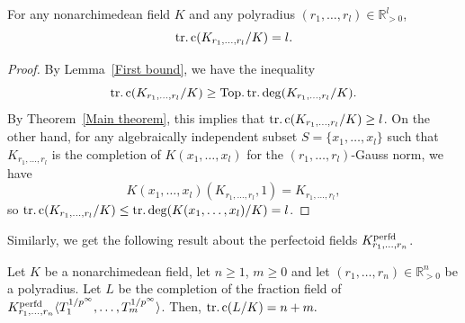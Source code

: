 \begin{cor}
    \label{cor:kr:trc}
For any nonarchimedean field $K$ and any polyradius $(r_1,\dots, r_l)\in \mathbb{R}_{>0}^{l}$,
\begin{equation*}
\operatorname{tr.c}(K_{r_1,\dots, r_l}/K)=l.
\end{equation*}
\end{cor}

\begin{proof}
By Lemma~\ref{First bound}, we have the inequality 
\begin{equation*}
\operatorname{tr.c}(K_{r_1,\dots, r_l}/K)\geq \operatorname{Top.tr.deg}(K_{r_1,\dots, r_l}/K).
\end{equation*}
By Theorem~\ref{Main theorem}, this implies that $\operatorname{tr.c}(K_{r_1,\dots, r_l}/K)\geq l$. On the other hand, for any algebraically independent subset $S=\{x_1,\dots, x_l\}$ such that $K_{r_1,\dots, r_l}$ is the completion of $K(x_1,\dots, x_l)$ for the $(r_1,\dots, r_l)$-Gauss norm, we have \begin{equation*}
K(x_1,\dots, x_l)(K_{r_1,\dots, r_l}, 1)=K_{r_1,\dots, r_l},
\end{equation*}
so $\operatorname{tr.c}(K_{r_1,\dots, r_l}/K)\leq \operatorname{tr.deg}(K(x_1,\dots, x_l)/K)=l$.
\end{proof}
Similarly, we get the following result about the perfectoid fields $K_{r_1,\dots, r_n}^{\operatorname{perfd}}$. 
\begin{thm}
    \label{lem:tate:frac}
    Let \(K\) be a nonarchimedean field, let $n\geq1$, $m\geq0$ and let $(r_1,\dots, r_n)\in \mathbb{R}_{>0}^{n}$ be a polyradius. 
    Let \(L\) be the completion of the fraction field of \(K_{r_{1}, \ldots, r_{n}}^{\operatorname{perfd}}\langle
    T_{1}^{1/p^{\infty}}, \ldots, T_{m}^{1/p^{\infty}} \rangle \).
    Then, \(\operatorname{tr.c}(L / K) = n+m.\)
\end{thm}
